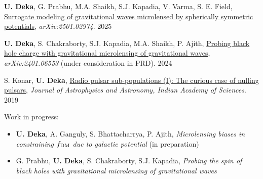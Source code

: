 \begin{itemize}[noitemsep]
{
\item\textbf{U. Deka}, G. Prabhu, M.A. Shaikh, S.J. Kapadia, V. Varma, S. E. Field, \href{https://arxiv.org/abs/2501.02974}{Surrogate modeling of gravitational waves microlensed by spherically symmetric potentials}, \textit{arXiv:2501.02974}. \hfill 2025
\item \textbf{U. Deka}, S. Chakraborty, S.J. Kapadia, M.A. Shaikh, P. Ajith, \href{https://arxiv.org/pdf/2401.06553}{Probing black hole charge with gravitational microlensing of gravitational waves}, \textit{arXiv:2401.06553} (under consideration in PRD). \hfill  2024
    
\item S. Konar, \textbf{U. Deka}, \href{https://www.ias.ac.in/article/fulltext/joaa/040/05/0042}{Radio pulsar sub-populations (I): The curious case of nulling pulsars}, \textit{Journal of Astrophysics and Astronomy, Indian Academy of Sciences}. \hfill 2019

\item Work in progress:
    \begin{itemize}
    \item\textbf{U. Deka}, A. Ganguly, S. Bhattacharrya, P. Ajith, \textit{Microlensing biases in constraining $f_{\rm DM}$ due to galactic potential} (in preparation)
    \item G. Prabhu, \textbf{U. Deka}, S. Chakraborty, S.J. Kapadia, \textit{Probing the spin of black holes with gravitational microlensing of gravitational waves}
    \end{itemize}
}\end{itemize}